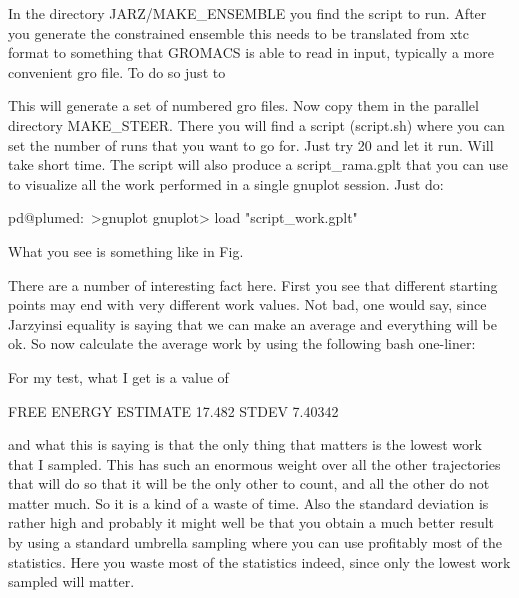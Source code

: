 In the directory J\+A\+R\+Z/\+M\+A\+K\+E\+\_\+\+E\+N\+S\+E\+M\+B\+L\+E you find the script to run. After you generate the constrained ensemble this needs to be translated from xtc format to something that G\+R\+O\+M\+A\+C\+S is able to read in input, typically a more convenient gro file. To do so just to 


This will generate a set of numbered gro files. Now copy them in the parallel directory M\+A\+K\+E\+\_\+\+S\+T\+E\+E\+R. There you will find a script (script.\+sh) where you can set the number of runs that you want to go for. Just try 20 and let it run. Will take short time. The script will also produce a script\+\_\+rama.\+gplt that you can use to visualize all the work performed in a single gnuplot session. Just do\+: \begin{DoxyVerb}pd@plumed:~>gnuplot
gnuplot> load "script_work.gplt"
\end{DoxyVerb}


What you see is something like in Fig.

\label{belfast-5_belfast-5-jarz-fig}%
\hypertarget{belfast-5_belfast-5-jarz-fig}{}%
 There are a number of interesting fact here. First you see that different starting points may end with very different work values. Not bad, one would say, since Jarzyinsi equality is saying that we can make an average and everything will be ok. So now calculate the average work by using the following bash one-\/liner\+:



For my test, what I get is a value of \begin{DoxyVerb}FREE ENERGY ESTIMATE  17.482  STDEV  7.40342
\end{DoxyVerb}
 and what this is saying is that the only thing that matters is the lowest work that I sampled. This has such an enormous weight over all the other trajectories that will do so that it will be the only other to count, and all the other do not matter much. So it is a kind of a waste of time. Also the standard deviation is rather high and probably it might well be that you obtain a much better result by using a standard umbrella sampling where you can use profitably most of the statistics. Here you waste most of the statistics indeed, since only the lowest work sampled will matter.

